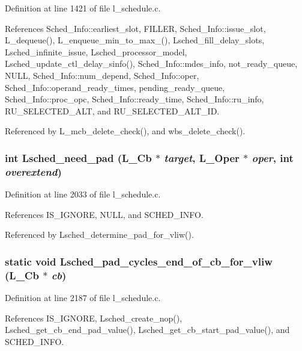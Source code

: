 Definition at line 1421 of file l\_\-schedule.c.

References Sched\_\-Info::earliest\_\-slot, FILLER, Sched\_\-Info::issue\_\-slot, L\_\-dequeue(), L\_\-enqueue\_\-min\_\-to\_\-max\_(), Lsched\_\-fill\_\-delay\_\-slots, Lsched\_\-infinite\_\-issue, Lsched\_\-processor\_\-model, Lsched\_\-update\_\-ctl\_\-delay\_\-sinfo(), Sched\_\-Info::mdes\_\-info, not\_\-ready\_\-queue, NULL, Sched\_\-Info::num\_\-depend, Sched\_\-Info::oper, Sched\_\-Info::operand\_\-ready\_\-times, pending\_\-ready\_\-queue, Sched\_\-Info::proc\_\-opc, Sched\_\-Info::ready\_\-time, Sched\_\-Info::ru\_\-info, RU\_\-SELECTED\_\-ALT, and RU\_\-SELECTED\_\-ALT\_\-ID.

Referenced by L\_\-mcb\_\-delete\_\-check(), and wbs\_\-delete\_\-check().
\subsubsection{\setlength{\rightskip}{0pt plus 5cm}int Lsched\_\-need\_\-pad (L\_\-Cb $\ast$ {\em target}, L\_\-Oper $\ast$ {\em oper}, int {\em overextend})}\label{l__schedule_8c_aa099d7828bbac61af2f67eaac8c4b9a}




Definition at line 2033 of file l\_\-schedule.c.

References IS\_\-IGNORE, NULL, and SCHED\_\-INFO.

Referenced by Lsched\_\-determine\_\-pad\_\-for\_\-vliw().
\subsubsection{\setlength{\rightskip}{0pt plus 5cm}static void Lsched\_\-pad\_\-cycles\_\-end\_\-of\_\-cb\_\-for\_\-vliw (L\_\-Cb $\ast$ {\em cb})\hspace{0.3cm}{\tt  [static]}}\label{l__schedule_8c_39431a5fbacd2cea668db7733c89038e}




Definition at line 2187 of file l\_\-schedule.c.

References IS\_\-IGNORE, Lsched\_\-create\_\-nop(), Lsched\_\-get\_\-cb\_\-end\_\-pad\_\-value(), Lsched\_\-get\_\-cb\_\-start\_\-pad\_\-value(), and SCHED\_\-INFO.

